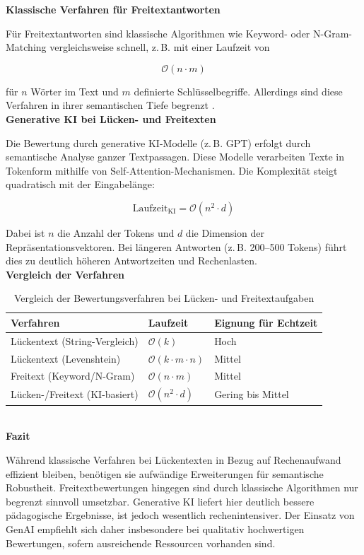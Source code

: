 \documentclass[a4paper,12pt]{article}
\begin{document}
\textbf{Klassische Verfahren für Freitextantworten} 

Für Freitextantworten sind klassische Algorithmen wie Keyword- oder N-Gram-Matching vergleichsweise schnell, z.\,B. mit einer Laufzeit von

\[
\mathcal{O}(n \cdot m)
\]

für \(n\) Wörter im Text und \(m\) definierte Schlüsselbegriffe. Allerdings sind diese Verfahren in ihrer semantischen Tiefe begrenzt \parencite{navarro, jurafsky}.\\

\textbf{Generative KI bei Lücken- und Freitexten}  

Die Bewertung durch generative KI-Modelle (z.\,B. GPT) erfolgt durch semantische Analyse ganzer Textpassagen. Diese Modelle verarbeiten Texte in Tokenform mithilfe von Self-Attention-Mechanismen. Die Komplexität steigt quadratisch mit der Eingabelänge:

\[
\text{Laufzeit}_{\text{KI}} = \mathcal{O}(n^2 \cdot d)
\]

Dabei ist \(n\) die Anzahl der Tokens und \(d\) die Dimension der Repräsentationsvektoren. Bei längeren Antworten (z.\,B. 200–500 Tokens) führt dies zu deutlich höheren Antwortzeiten und Rechenlasten.\\

\newpage
\textbf{Vergleich der Verfahren}  
\begin{table}[h!]
\centering
\begin{tabular}{@{}lll@{}}
\toprule
\textbf{Verfahren} & \textbf{Laufzeit} & \textbf{Eignung für Echtzeit} \\
\midrule
Lückentext (String-Vergleich) & \( \mathcal{O}(k) \) & Hoch \\
Lückentext (Levenshtein) & \( \mathcal{O}(k \cdot m \cdot n) \) & Mittel \\
Freitext (Keyword/N-Gram) & \( \mathcal{O}(n \cdot m) \) & Mittel \\
Lücken-/Freitext (KI-basiert) & \( \mathcal{O}(n^2 \cdot d) \) & Gering bis Mittel \\
\bottomrule
\end{tabular}
\caption{Vergleich der Bewertungsverfahren bei Lücken- und Freitextaufgaben}
\end{table}\\

\textbf{Fazit}

Während klassische Verfahren bei Lückentexten in Bezug auf Rechenaufwand effizient bleiben, benötigen sie aufwändige Erweiterungen für semantische Robustheit. Freitextbewertungen hingegen sind durch klassische Algorithmen nur begrenzt sinnvoll umsetzbar. Generative KI liefert hier deutlich bessere pädagogische Ergebnisse, ist jedoch wesentlich rechenintensiver. Der Einsatz von GenAI empfiehlt sich daher insbesondere bei qualitativ hochwertigen Bewertungen, sofern ausreichende Ressourcen vorhanden sind.
\end{document}
